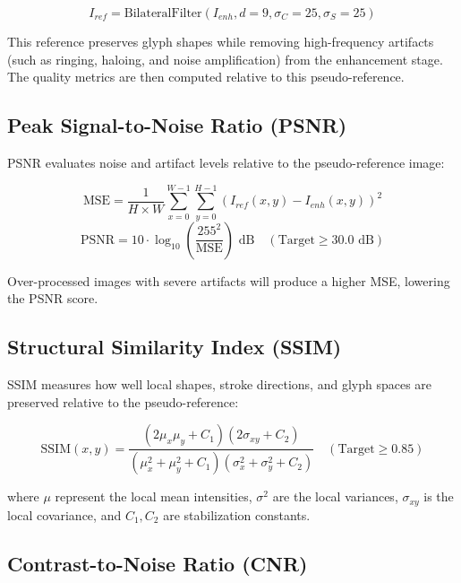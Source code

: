 \begin{equation}
I_{ref} = \text{BilateralFilter}(I_{enh}, d=9, \sigma_C=25, \sigma_S=25)
\end{equation}

This reference preserves glyph shapes while removing high-frequency artifacts (such as ringing, haloing, and noise amplification) from the enhancement stage. The quality metrics are then computed relative to this pseudo-reference.

\subsection{Peak Signal-to-Noise Ratio (PSNR)}

PSNR evaluates noise and artifact levels relative to the pseudo-reference image:

\begin{equation}
\text{MSE} = \frac{1}{H \times W} \sum_{x=0}^{W-1} \sum_{y=0}^{H-1} \left( I_{ref}(x, y) - I_{enh}(x, y) \right)^2
\end{equation}
\begin{equation}
\text{PSNR} = 10 \cdot \log_{10}\left( \frac{255^2}{\text{MSE}} \right) \text{ dB} \quad (\text{Target} \ge 30.0\text{ dB})
\end{equation}

Over-processed images with severe artifacts will produce a higher MSE, lowering the PSNR score.

\subsection{Structural Similarity Index (SSIM)}

SSIM measures how well local shapes, stroke directions, and glyph spaces are preserved relative to the pseudo-reference:

\begin{equation}
\text{SSIM}(x, y) = \frac{(2\mu_x\mu_y + C_1)(2\sigma_{xy} + C_2)}{(\mu_x^2 + \mu_y^2 + C_1)(\sigma_x^2 + \sigma_y^2 + C_2)} \quad (\text{Target} \ge 0.85)
\end{equation}

where $\mu$ represent the local mean intensities, $\sigma^2$ are the local variances, $\sigma_{xy}$ is the local covariance, and $C_1, C_2$ are stabilization constants.

\subsection{Contrast-to-Noise Ratio (CNR)}

